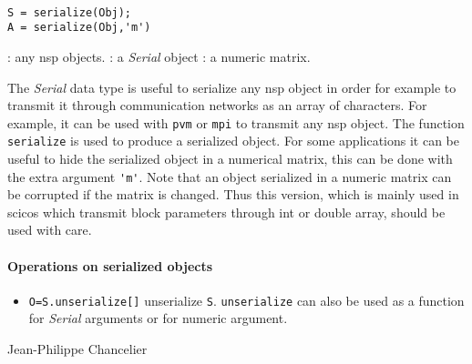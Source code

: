 
\begin{mandesc}
   \\
\end{mandesc}
\begin{calling_sequence}
\begin{verbatim}
S = serialize(Obj);
A = serialize(Obj,'m')
\end{verbatim}
\end{calling_sequence}
\begin{parameters}
  \begin{varlist}
    :  any nsp objects. 
    : a \emph{Serial} object 
    : a numeric matrix.
  \end{varlist}
\end{parameters}

\begin{mandescription}
The \emph{Serial} data type is useful to serialize any nsp object in order 
for example to transmit it through communication networks as an array of 
characters. For example, it can be used with \verb+pvm+ or \verb+mpi+ to transmit any 
nsp object. The function \verb+serialize+ is used to produce a serialized object. 
For some applications it can be useful to hide the serialized object in a 
numerical matrix, this can be done with the extra argument \verb+'m'+. Note 
that an object serialized in a numeric matrix can be corrupted if 
the matrix is changed. Thus this version, which is mainly used in scicos 
which transmit block parameters through int or double array, should be used with care. 
\end{mandescription}

\paragraph{Operations on serialized objects}
\begin{itemize}
   \item \verb+O=S.unserialize[]+ unserialize \verb+S+. \verb+unserialize+ can 
     also be used as a function for \emph{Serial} arguments or for numeric 
     argument.
\end{itemize}

\begin{examples}
  \begin{program}
  \end{program}
 \end{examples}

\begin{manseealso}

\end{manseealso}

\begin{authors}
   Jean-Philippe Chancelier
\end{authors}
